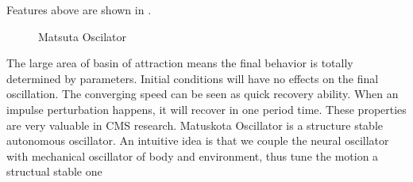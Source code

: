 Features above are shown in \figurename \label{fig:matsuta oscilation}.
\begin{figure}[!h]
\centerline{
\hfill
{}
}
\caption{Matsuta Oscilator}
\label{fig:matsuta oscilation}
\end{figure} 
The large area of basin of attraction means the final behavior is totally determined by parameters. 
Initial conditions will have no effects on the final oscillation. 
The converging speed can be seen as quick recovery ability.
When an impulse perturbation happens, it will recover in one period time.
These properties are very valuable in CMS research. 
Matuskota Oscillator is a structure stable autonomous oscillator.
An intuitive idea is that we couple the neural oscillator with mechanical oscillator of body and environment, thus tune the motion a structual stable one

